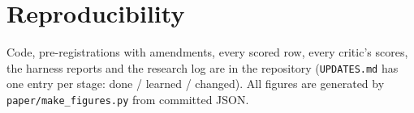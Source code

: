 \documentclass[11pt]{article}
\begin{document}
\section{Reproducibility}
Code, pre-registrations with amendments, every scored row, every critic's scores, the harness reports and the research log are in the repository (\texttt{UPDATES.md} has one entry per stage: done / learned / changed). All figures are generated by \texttt{paper/make\_figures.py} from committed JSON.
\end{document}
